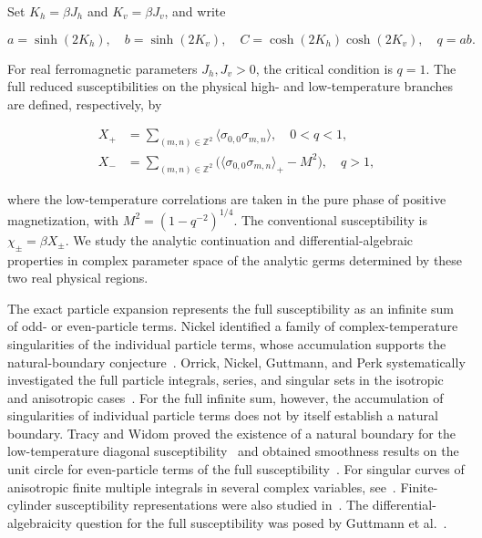 \documentclass[11pt,a4paper]{article}
\numberwithin{equation}{section}
\theoremstyle{plain}
\theoremstyle{definition}
\begin{document}
Set \(K_h=\beta J_h\) and \(K_v=\beta J_v\), and write

\[a=\sinh(2K_h),\quad b=\sinh(2K_v),\quad C=\cosh(2K_h)\cosh(2K_v),\quad q=ab.\]

For real ferromagnetic parameters \(J_h,J_v>0\), the critical condition is \(q=1\). The full reduced susceptibilities on the physical high- and low-temperature branches are defined, respectively, by

\[\begin{aligned}X_+&=\sum_{(m,n)\in\mathbb Z^2}\langle\sigma_{0,0}\sigma_{m,n}\rangle,\quad 0<q<1,\\ X_-&=\sum_{(m,n)\in\mathbb Z^2}\bigl(\langle\sigma_{0,0}\sigma_{m,n}\rangle_+-M^2\bigr),\quad q>1,\end{aligned}\]

where the low-temperature correlations are taken in the pure phase of positive magnetization, with \(M^2=(1-q^{-2})^{1/4}\). The conventional susceptibility is \(\chi_\pm=\beta X_\pm\). We study the analytic continuation and differential-algebraic properties in complex parameter space of the analytic germs determined by these two real physical regions.

The exact particle expansion represents the full susceptibility as an infinite sum of odd- or even-particle terms. Nickel identified a family of complex-temperature singularities of the individual particle terms, whose accumulation supports the natural-boundary conjecture~\cite{nickel99,nickel00}. Orrick, Nickel, Guttmann, and Perk systematically investigated the full particle integrals, series, and singular sets in the isotropic and anisotropic cases~\cite{orrick}. For the full infinite sum, however, the accumulation of singularities of individual particle terms does not by itself establish a natural boundary. Tracy and Widom proved the existence of a natural boundary for the low-temperature diagonal susceptibility~\cite{twdiag} and obtained smoothness results on the unit circle for even-particle terms of the full susceptibility~\cite{twsing}. For singular curves of anisotropic finite multiple integrals in several complex variables, see~\cite{anisotropy}. Finite-cylinder susceptibility representations were also studied in~\cite{bugrij}. The differential-algebraicity question for the full susceptibility was posed by Guttmann et al.~\cite{guttmannDT}.
\end{document}
